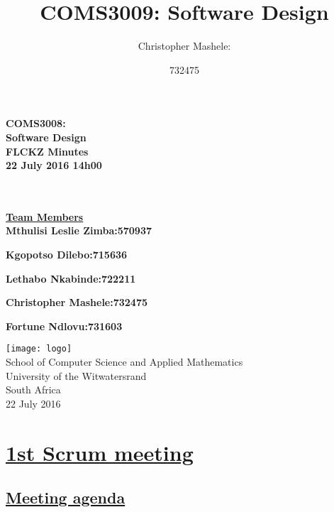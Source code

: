 \documentclass{article}
\title{COMS3009: Software Design}
\author{
	Christopher Mashele:\\
	\and
	732475\\
	}
\begin{document}
\begin{titlepage}
	
		\hspace{0.5cm}
		\huge
		\center
		\textbf{COMS3008:\\ Software Design}\\

		\vspace*{1cm}
		\Large
		\hspace{2cm}
		\center
		\textbf{FLCKZ Minutes\\ 22 July 2016 14h00}\\\\\\
		\vspace*{2cm}
		\normalsize
		\hspace{2.5cm}

		\textbf{\underline{Team Members}}\\

		\textbf{Mthulisi Leslie Zimba:\hfill570937}

		\textbf{Kgopotso Dilebo:\hfill 715636}

		\textbf{Lethabo Nkabinde:\hfill 722211}

		\textbf{Christopher Mashele:\hfill 732475}
		
		\textbf{Fortune Ndlovu:\hfill 731603}

		
		\vspace{2cm}
		\normalsize
		\hspace{4cm}
		\centre
		\texttt{[image: logo]}\\
		\hspace{3cm} School of Computer Science and Applied Mathematics\\
		\hspace{3cm}University of the Witwatersrand\\
		\hspace{3cm} South Africa\\
		\hspace{3cm} 22 July 2016 \\
	
\end{titlepage}

\section*{\underline{1st Scrum meeting}}
\subsection*{\underline{Meeting agenda}}
\end{document}
